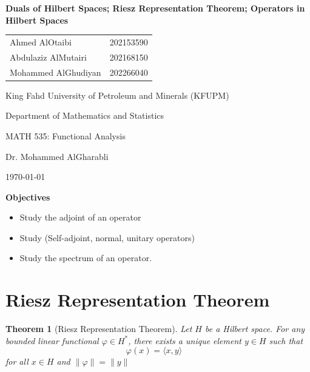 \documentclass{report}
\newtheorem{thm}{Theorem}
\begin{document}
\begin{titlepage}
  \centering
  {\LARGE\bfseries Duals of Hilbert Spaces; Riesz Representation Theorem; Operators in Hilbert Spaces \par}
  \vspace{2cm}
  {\large
    \begin{tabular}{l l}
      Ahmed AlOtaibi      & 202153590 \\
      Abdulaziz AlMutairi & 202168150 \\
      Mohammed AlGhudiyan & 202266040 \\
    \end{tabular}
  \par}
  \vspace{1cm}
  {\large King Fahd University of Petroleum and Minerals (KFUPM)\par}
  \vspace{1cm}
  {\large Department of Mathematics and Statistics\par}
  \vspace{1cm}
  {\large MATH 535: Functional Analysis\par}
  \vspace{1cm}
  {\large Dr. Mohammed AlGharabli\par}
  \vspace{1cm}
  {\large \today\par}
\end{titlepage}
\tableofcontents
\newpage


\textbf{Objectives}
\begin{itemize}
  \item Study the adjoint of an operator
  \item Study (Self-adjoint, normal, unitary operators)
  \item Study the spectrum of an operator.
\end{itemize}


\section{Riesz Representation Theorem}

\begin{thm}[Riesz Representation Theorem]
    Let $H$ be a Hilbert space.
    For any bounded linear functional $\varphi \in H^{*}$,
    there exists a unique element $y \in H$ such that\\

$$\varphi(x)=\langle x, y\rangle \quad$$ for all $x \in H$ and $\|\varphi\|=\|y\|$ \\

\end{thm}
\end{document}
